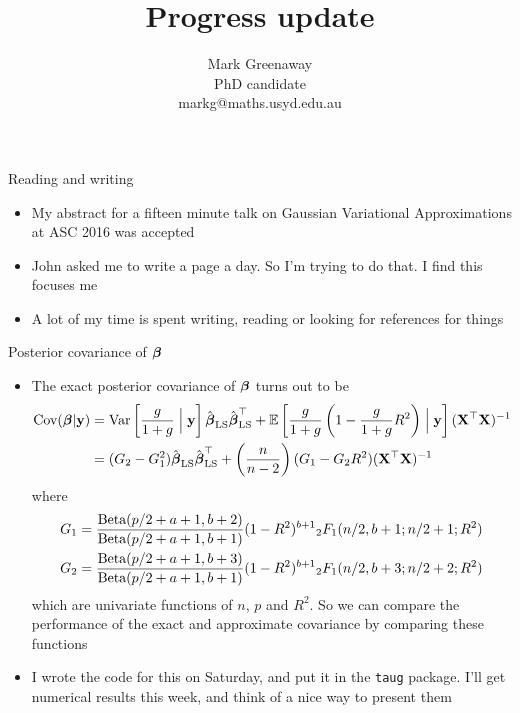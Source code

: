 \documentclass{beamer}
\title{Progress update}
\author{Mark Greenaway\\PhD candidate\\markg@maths.usyd.edu.au}
\begin{document}
\begin{frame}
\titlepage
\end{frame}

\begin{frame}{Reading and writing}
\begin{itemize}
\item My abstract for a fifteen minute talk on Gaussian Variational Approximations at ASC 2016 was accepted
\item John asked me to write a page a day. So I'm trying to do that. I find this focuses me
\item A lot of my time is spent writing, reading or looking for references for things
\end{itemize}
\end{frame}

\begin{frame}{Posterior covariance of ${\boldsymbol \beta}$}
\begin{itemize}
\item 
The exact posterior covariance of ${\boldsymbol \beta}$ turns out to be
\tiny
\begin{align*}
	\mbox{Cov}({\boldsymbol \beta}|{\bf y}) &=  \text{Var}\left[\frac{g}{1+g} \Bigm| {\bf y}\right] \hat{{\boldsymbol \beta}}_{\text{LS}} \hat{{\boldsymbol \beta}}_{\text{LS}}^\top + 
	 \mathbb{E}\left[\frac{g}{1 + g} \left( 1 - \frac{g}{1 + g} R^2 \right) \Bigm| {\bf y}\right] ({\bf X}^\top {\bf X})^{-1}\\
	&= (G_2 - G_1^2) \hat{{\boldsymbol \beta}}_{\text{LS}} \hat{{\boldsymbol \beta}}_{\text{LS}}^\top + \left( \frac{n}{n - 2} \right) (G_1 - G_2 R^2) ({\bf X}^\top {\bf X})^{-1}
\end{align*}
\small where \tiny
\begin{align*}
G_1 &= \frac{\text{Beta}(p/2 + a + 1, b + 2)}{\text{Beta}(p /2 + a + 1, b + 1)} (1 - R^2)^{b+1} {}_2 F_1(n/2, b + 1; n/2 + 1; R^2) \\
G_2 &= \frac{\text{Beta}(p/2 + a + 1, b + 3)}{\text{Beta}(p /2 + a + 1, b + 1)} (1 - R^2)^{b+1} {}_2 F_1(n/2, b + 3; n/2 + 2; R^2)
\end{align*}
\small
which are univariate functions of $n$, $p$ and $R^2$.
So we can compare the performance of the exact and approximate covariance by comparing these 
functions
\item I wrote the code for this on Saturday, and put it in the \texttt{taug} package. I'll get numerical 
results this week, and think of a nice way to present them
\end{itemize}
\end{frame}
\end{document}
